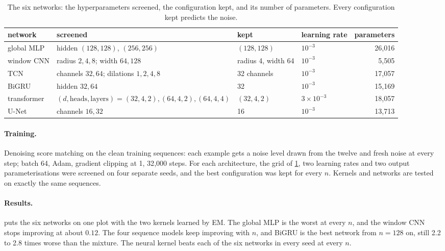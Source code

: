 \documentclass{article}
\begin{document}
\begin{table}[!htbp]
  \caption{The six networks: the hyperparameters screened, the configuration kept, and its number of parameters. Every
  configuration kept predicts the noise.}
  \label{tab:networks}
  \centering
  \small
  \begin{tabular}{@{}llll r@{}}
    \toprule
    network & screened & kept & learning rate & parameters\\
    \midrule
    global MLP   & hidden $(128,128)$, $(256,256)$ & $(128,128)$ & $10^{-3}$ & 26{,}016\\
    window CNN   & radius $2,4,8$; width $64,128$ & radius 4, width 64 & $10^{-3}$ & 5{,}505\\
    TCN          & channels $32,64$; dilations $1,2,4,8$ & 32 channels & $10^{-3}$ & 17{,}057\\
    BiGRU        & hidden $32,64$ & 32 & $10^{-3}$ & 15{,}169\\
    transformer  & $(d,\text{heads},\text{layers})=(32,4,2),(64,4,2),(64,4,4)$ & $(32,4,2)$ & $3\times10^{-3}$ & 18{,}057\\
    U-Net        & channels $16,32$ & 16 & $10^{-3}$ & 13{,}713\\
    \bottomrule
  \end{tabular}
\end{table}

\paragraph{Training.} Denoising score matching on the clean training sequences: each example gets a noise level drawn
from the twelve and fresh noise at every step; batch 64, Adam, gradient clipping at 1, 32{,}000 steps. For each
architecture, the grid of \cref{tab:networks}, two learning rates and two output parameterisations were screened on
four separate seeds, and the best configuration was kept for every $n$. Kernels and networks are tested on exactly the
same sequences.

\paragraph{Results.}  puts the six networks on one plot with the two kernels learned by EM. The
global MLP is the worst at every $n$, and the window CNN stops improving at about $0.12$. The four sequence models keep
improving with $n$, and BiGRU is the best network from $n=128$ on, still 2.2 to 2.8 times worse than the mixture. The
neural kernel beats each of the six networks in every seed at every $n$.
\end{document}
